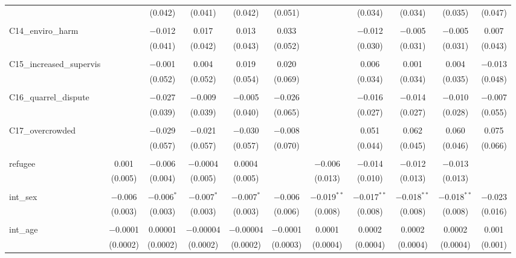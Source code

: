\begin{table}[H]
\begin{tabular}{@{\extracolsep{4pt}}lcccccccccc}
  &  & (0.042) & (0.041) & (0.042) & (0.051) &  & (0.034) & (0.034) & (0.035) & (0.047) \\ 
  & & & & & & & & & & \\ 
 C14\_enviro\_harm &  & $-$0.012 & 0.017 & 0.013 & 0.033 &  & $-$0.012 & $-$0.005 & $-$0.005 & 0.007 \\ 
  &  & (0.041) & (0.042) & (0.043) & (0.052) &  & (0.030) & (0.031) & (0.031) & (0.043) \\ 
  & & & & & & & & & & \\ 
 C15\_increased\_supervis &  & $-$0.001 & 0.004 & 0.019 & 0.020 &  & 0.006 & 0.001 & 0.004 & $-$0.013 \\ 
  &  & (0.052) & (0.052) & (0.054) & (0.069) &  & (0.034) & (0.034) & (0.035) & (0.048) \\ 
  & & & & & & & & & & \\ 
 C16\_quarrel\_dispute &  & $-$0.027 & $-$0.009 & $-$0.005 & $-$0.026 &  & $-$0.016 & $-$0.014 & $-$0.010 & $-$0.007 \\ 
  &  & (0.039) & (0.039) & (0.040) & (0.065) &  & (0.027) & (0.027) & (0.028) & (0.055) \\ 
  & & & & & & & & & & \\ 
 C17\_overcrowded &  & $-$0.029 & $-$0.021 & $-$0.030 & $-$0.008 &  & 0.051 & 0.062 & 0.060 & 0.075 \\ 
  &  & (0.057) & (0.057) & (0.057) & (0.070) &  & (0.044) & (0.045) & (0.046) & (0.066) \\ 
  & & & & & & & & & & \\ 
 refugee & 0.001 & $-$0.006 & $-$0.0004 & 0.0004 &  & $-$0.006 & $-$0.014 & $-$0.012 & $-$0.013 &  \\ 
  & (0.005) & (0.004) & (0.005) & (0.005) &  & (0.013) & (0.010) & (0.013) & (0.013) &  \\ 
  & & & & & & & & & & \\ 
 int\_sex & $-$0.006 & $-$0.006$^{*}$ & $-$0.007$^{*}$ & $-$0.007$^{*}$ & $-$0.006 & $-$0.019$^{**}$ & $-$0.017$^{**}$ & $-$0.018$^{**}$ & $-$0.018$^{**}$ & $-$0.023 \\ 
  & (0.003) & (0.003) & (0.003) & (0.003) & (0.006) & (0.008) & (0.008) & (0.008) & (0.008) & (0.016) \\ 
  & & & & & & & & & & \\ 
 int\_age & $-$0.0001 & 0.00001 & $-$0.00004 & $-$0.00004 & $-$0.0001 & 0.0001 & 0.0002 & 0.0002 & 0.0002 & 0.001 \\ 
  & (0.0002) & (0.0002) & (0.0002) & (0.0002) & (0.0003) & (0.0004) & (0.0004) & (0.0004) & (0.0004) & (0.001) \\ 

\end{tabular}
\end{table}
